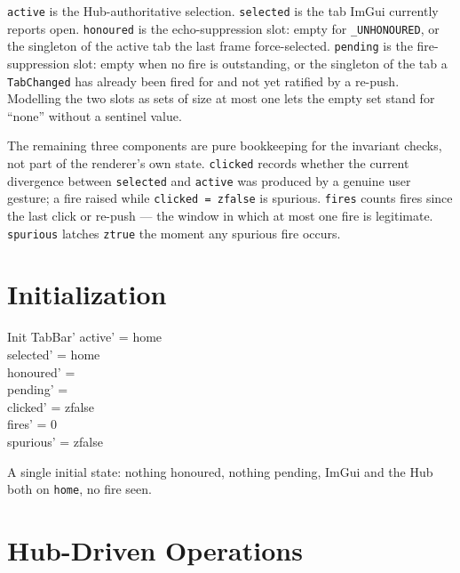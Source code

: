 \documentclass[a4paper,10pt,fleqn]{article}
\begin{document}
\texttt{active} is the Hub-authoritative selection.  \texttt{selected} is the
tab ImGui currently reports open.  \texttt{honoured} is the echo-suppression
slot: empty for \texttt{\_UNHONOURED}, or the singleton of the active tab the
last frame force-selected.  \texttt{pending} is the fire-suppression slot:
empty when no fire is outstanding, or the singleton of the tab a
\texttt{TabChanged} has already been fired for and not yet ratified by a
re-push.  Modelling the two slots as sets of size at most one lets the empty
set stand for ``none'' without a sentinel value.

The remaining three components are pure bookkeeping for the invariant checks,
not part of the renderer's own state.  \texttt{clicked} records whether the
current divergence between \texttt{selected} and \texttt{active} was produced
by a genuine user gesture; a fire raised while \texttt{clicked = zfalse} is
spurious.  \texttt{fires} counts fires since the last click or re-push --- the
window in which at most one fire is legitimate.  \texttt{spurious} latches
\texttt{ztrue} the moment any spurious fire occurs.

\section{Initialization}

\begin{schema}{Init}
  TabBar'
\where
  active' = home \\
  selected' = home \\
  honoured' = \emptyset \\
  pending' = \emptyset \\
  clicked' = zfalse \\
  fires' = 0 \\
  spurious' = zfalse
\end{schema}

A single initial state: nothing honoured, nothing pending, ImGui and the Hub
both on \texttt{home}, no fire seen.

\section{Hub-Driven Operations}
\end{document}
